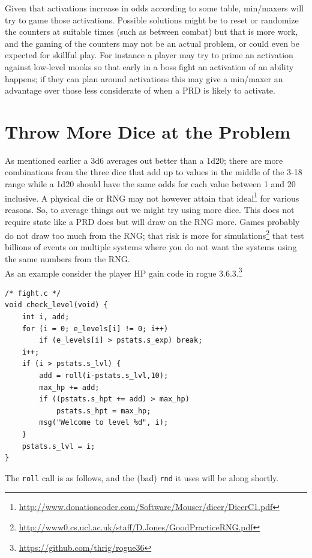\documentclass[12pt,a4paper]{article}
\begin{document}
Given that activations increase in odds according to some table,
min/maxers will try to game those activations. Possible solutions might
be to reset or randomize the counters at suitable times (such as between
combat) but that is more work, and the gaming of the counters may not be
an actual problem, or could even be expected for skillful play. For
instance a player may try to prime an activation against low-level mooks
so that early in a boss fight an activation of an ability happens; if
they can plan around activations this may give a min/maxer an advantage
over those less considerate of when a PRD is likely to activate.

\section*{Throw More Dice at the Problem}

As mentioned earlier a 3d6 averages out better than a 1d20; there are
more combinations from the three dice that add up to values in the
middle of the 3-18 range while a 1d20 should have the same odds for each
value between 1 and 20 inclusive. A physical die or RNG may not however
attain that
ideal\footnote{\url{http://www.donationcoder.com/Software/Mouser/dicer/DicerC1.pdf}}
for various reasons. So, to average things out we might try using more
dice. This does not require state like a PRD does but will draw on the
RNG more. Games probably do not draw too much from the RNG; that risk is
more for
simulations\footnote{\url{http://www0.cs.ucl.ac.uk/staff/D.Jones/GoodPracticeRNG.pdf}}
that test billions of events on multiple systems where you do not want
the systems using the same numbers from the RNG. \\

As an example consider the player HP gain code in rogue
3.6.3.\footnote{\url{https://github.com/thrig/rogue36}}

\begin{verbatim}
/* fight.c */
void check_level(void) {
    int i, add;
    for (i = 0; e_levels[i] != 0; i++)
        if (e_levels[i] > pstats.s_exp) break;
    i++;
    if (i > pstats.s_lvl) {
        add = roll(i-pstats.s_lvl,10);
        max_hp += add;
        if ((pstats.s_hpt += add) > max_hp)
            pstats.s_hpt = max_hp;
        msg("Welcome to level %d", i);
    }
    pstats.s_lvl = i;
}
\end{verbatim}

The \texttt{roll} call is as follows, and the (bad) \texttt{rnd} it
uses will be along shortly.
\end{document}
